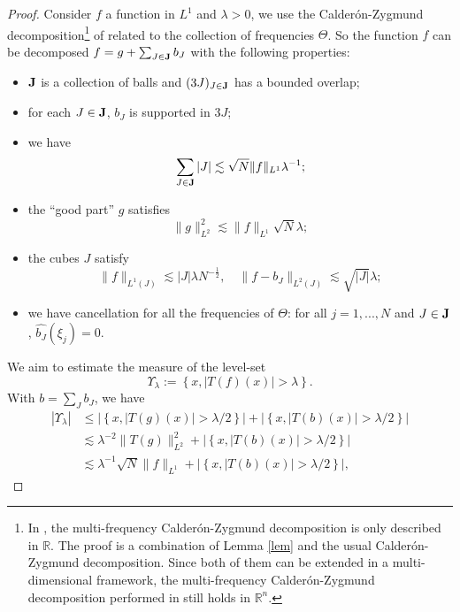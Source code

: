 \documentclass[11pt]{amsart}
\theoremstyle{remark}
\newcommand{\R}{{\mathbb R}}
\begin{document}
\begin{proof} Consider $f$ a function in $L^1$ and $\lambda>0$, we use the Calder\'on-Zygmund decomposition\footnote{In \cite{NOT}, the multi-frequency Calder\'on-Zygmund decomposition is only described in $\R$. The proof is a combination of Lemma \ref{lem} and the usual Calder\'on-Zygmund decomposition. Since both of them can be extended in a multi-dimensional framework, the multi-frequency Calder\'on-Zygmund decomposition performed in \cite{NOT} still holds in $\R^n$.} of \cite{NOT} related to the collection of frequencies $\Theta$. So the function $f$ can be decomposed $f = g + \sum_{J\in {\bf J}} b_J$ with the following properties:
\begin{itemize}
 \item ${\bf J}$ is a collection of balls and $(3J)_{J\in{\bf J}}$ has a bounded overlap;
 \item for each $J\in{\bf J}$, $b_J$ is supported in $3J$;  
 \item we have 
\begin{equation} \sum_{J \in{\bf J}} |J| \lesssim \sqrt{N} \|f\|_{L^1} \lambda^{-1}; \label{eq:sumJ} \end{equation}
\item the ``good part'' $g$ satisfies
\begin{equation} \|g\|_{L^2}^2 \lesssim \|f\|_{L^1} \sqrt{N} \lambda; \label{eq:g} \end{equation}
\item the cubes $J$ satisfy
\begin{equation} \|f\|_{L^1(J)} \lesssim |J|\lambda N^{-\frac{1}{2}} , \quad \|f-b_J\|_{L^2(J)} \lesssim \sqrt{|J|} \lambda; \label{eq:b} \end{equation}
\item we have cancellation for all the frequencies of $\Theta$: for all $j=1,...,N$ and $J\in{\bf J}$, $\widehat{b_J}(\xi_j)=0$.
\end{itemize}
We aim to estimate the measure of the level-set
$$ \Upsilon_\lambda:=\left\{x, |T(f)(x)|>\lambda\right\}.$$
With $b=\sum_J b_J$, we have
\begin{align*}
 |\Upsilon_\lambda| & \leq \left|\left\{x, |T(g)(x)|>\lambda/2\right\}\right| + \left|\left\{x, |T(b)(x)|>\lambda/2\right\}\right| \\
 & \lesssim \lambda^{-2} \|T(g)\|_{L^2}^2 +  \left|\left\{x, |T(b)(x)|>\lambda/2\right\}\right| \\
 & \lesssim \lambda^{-1}\sqrt{N}\|f\|_{L^1} + \left|\left\{x, |T(b)(x)|>\lambda/2\right\}\right|,

\end{align*}
\end{proof}
\end{document}
